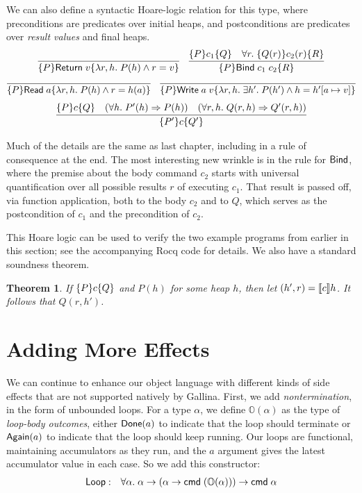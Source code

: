 \documentclass{amsbook}
\newtheorem{theorem}{Theorem}[chapter]
\theoremstyle{definition}
\theoremstyle{remark}
\numberwithin{section}{chapter}
\numberwithin{equation}{chapter}
\begin{document}
We can also define a syntactic Hoare-logic relation for this type, where preconditions are predicates over initial heaps, and postconditions are predicates over \emph{result values} and final heaps.
$$\infer{\hoare{P}{\mt{Return} \; v}{\lambda r, h. \; P(h) \land r = v}}{}
\quad \infer{\hoare{P}{\mt{Bind} \; c_1 \; c_2}{R}}{
  \hoare{P}{c_1}{Q}
  & \forall r. \; \hoare{Q(r)}{c_2(r)}{R}
}$$
$$\infer{\hoare{P}{\mt{Read} \; a}{\lambda r, h. \; P(h) \land r = \msel{h}{a}}}{}
\quad \infer{\hoare{P}{\mt{Write} \; a \; v}{\lambda r, h. \; \exists h'. \; P(h') \land h = \mupd{h'}{a}{v}}}{}$$
$$\infer{\hoare{P'}{c}{Q'}}{
  \hoare{P}{c}{Q}
  & (\forall h. \; P'(h) \Rightarrow P(h))
  & (\forall r, h. \; Q(r, h) \Rightarrow Q'(r, h))
}$$

Much of the details are the same as last chapter, including in a rule of consequence at the end.
The most interesting new wrinkle is in the rule for $\mathsf{Bind}$, where the premise about the body command $c_2$ starts with universal quantification over all possible results $r$ of executing $c_1$.
That result is passed off, via function application, both to the body $c_2$ and to $Q$, which serves as the postcondition of $c_1$ and the precondition of $c_2$.

This Hoare logic can be used to verify the two example programs from earlier in this section; see the accompanying Rocq code for details.
We also have a standard soundness theorem.
\begin{theorem}
  If $\{P\} c \{Q\}$ and $P(h)$ for some heap $h$, then let $(h', r) = {\left \llbracket c \right \rrbracket}h$.  It follows that $Q(r, h')$.
\end{theorem}


\section{Adding More Effects}

We can continue to enhance our object language with different kinds of side effects that are not supported natively by Gallina.
First, we add \emph{nontermination}, in the form of unbounded loops.
For a type $\alpha$, we define $\mathbb O(\alpha)$ as the type of \emph{loop-body outcomes}, either $\mathsf{Done}(a)$ to indicate that the loop should terminate or $\mathsf{Again}(a)$ to indicate that the loop should keep running.
Our loops are functional, maintaining accumulators as they run, and the $a$ argument gives the latest accumulator value in each case.
So we add this constructor:
\begin{eqnarray*}
  \mathsf{Loop} &:& \forall \alpha. \; \alpha \to (\alpha \to \mathsf{cmd} \; (\mathbb O(\alpha))) \to \mathsf{cmd} \; \alpha
\end{eqnarray*}
\end{document}
